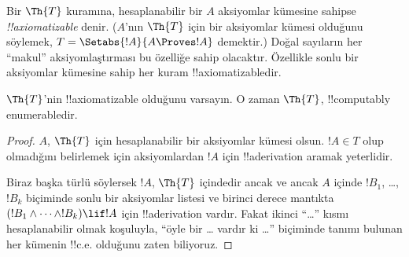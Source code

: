 \documentclass[../../../include/open-logic-section]{subfiles}
\begin{document}


Bir $\Th{T}$ kuramına, hesaplanabilir bir $A$ aksiyomlar kümesine sahipse
\emph{!!{axiomatizable}} denir. ($A$'nın $\Th{T}$ için bir aksiyomlar kümesi
olduğunu söylemek, $T = \Setabs{!A}{A \Proves !A}$ demektir.) Doğal
sayıların her “makul” aksiyomlaştırması bu özelliğe sahip olacaktır.
Özellikle sonlu bir aksiyomlar kümesine sahip her kuram
!!{axiomatizable}{}dir.

\begin{lem}
$\Th{T}$'nin !!{axiomatizable} olduğunu varsayın. O zaman $\Th{T}$,
!!{computably
enumerable}{}dir.
\end{lem}

\begin{proof}
$A$, $\Th{T}$ için hesaplanabilir bir aksiyomlar kümesi olsun. $!A \in T$
olup olmadığını belirlemek için aksiyomlardan $!A$ için !!a{derivation}
aramak yeterlidir.

Biraz başka türlü söylersek $!A$, $\Th{T}$ içindedir ancak ve ancak $A$
içinde $!B_1$, \dots, $!B_k$ biçiminde sonlu bir aksiyomlar listesi ve
birinci derece mantıkta
$(!B_1 \land \dots \land !B_k) \lif !A$ için !!a{derivation} vardır.
Fakat ikinci “\dots” kısmı hesaplanabilir olmak koşuluyla, “öyle bir \dots
vardır ki \dots” biçiminde tanımı bulunan her kümenin !!{c.e.} olduğunu
zaten biliyoruz.
\end{proof}
\end{document}
